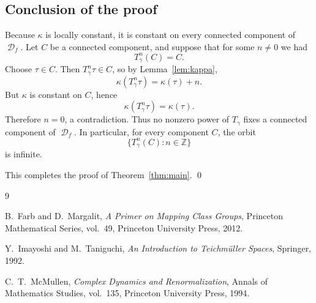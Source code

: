 \documentclass[11pt]{article}
\theoremstyle{plain}
\theoremstyle{definition}
\DeclareMathOperator{\D}{\mathcal D}
\begin{document}
\subsection{Conclusion of the proof}

Because \(\kappa\) is locally constant, it is constant on every connected component of \(\D_f\). Let \(C\) be a connected component, and suppose that for some \(n\neq0\) we had
\[
T_\gamma^n(C)=C.
\]
Choose \(\tau\in C\). Then \(T_\gamma^n\tau\in C\), so by Lemma~\ref{lem:kappa},
\[
\kappa(T_\gamma^n\tau)=\kappa(\tau)+n.
\]
But \(\kappa\) is constant on \(C\), hence
\[
\kappa(T_\gamma^n\tau)=\kappa(\tau).
\]
Therefore \(n=0\), a contradiction. Thus no nonzero power of \(T_\gamma\) fixes a connected component of \(\D_f\). In particular, for every component \(C\), the orbit
\[
\{T_\gamma^n(C):n\in\mathbb Z\}
\]
is infinite.

This completes the proof of Theorem~\ref{thm:main}. \qed

\begin{thebibliography}{9}

B.~Farb and D.~Margalit,
\emph{A Primer on Mapping Class Groups},
Princeton Mathematical Series, vol.~49, Princeton University Press, 2012.

Y.~Imayoshi and M.~Taniguchi,
\emph{An Introduction to Teichm\"uller Spaces},
Springer, 1992.

C.~T.~McMullen,
\emph{Complex Dynamics and Renormalization},
Annals of Mathematics Studies, vol.~135, Princeton University Press, 1994.

\end{thebibliography}
\end{document}
